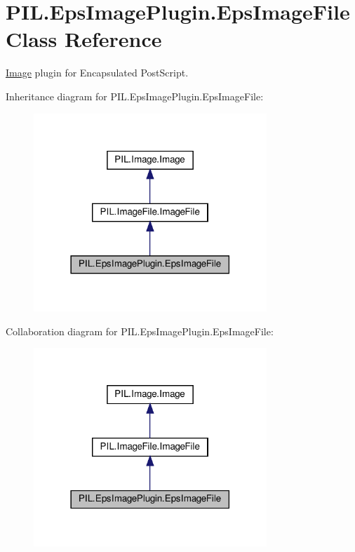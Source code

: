 \hypertarget{classPIL_1_1EpsImagePlugin_1_1EpsImageFile}{}\section{P\+I\+L.\+Eps\+Image\+Plugin.\+Eps\+Image\+File Class Reference}
\label{classPIL_1_1EpsImagePlugin_1_1EpsImageFile}


\hyperlink{namespacePIL_1_1Image}{Image} plugin for Encapsulated Post\+Script.  




Inheritance diagram for P\+I\+L.\+Eps\+Image\+Plugin.\+Eps\+Image\+File\+:
\nopagebreak
\begin{figure}[H]
\begin{center}
\leavevmode
\includegraphics[width=249pt]{classPIL_1_1EpsImagePlugin_1_1EpsImageFile__inherit__graph}
\end{center}
\end{figure}


Collaboration diagram for P\+I\+L.\+Eps\+Image\+Plugin.\+Eps\+Image\+File\+:
\nopagebreak
\begin{figure}[H]
\begin{center}
\leavevmode
\includegraphics[width=249pt]{classPIL_1_1EpsImagePlugin_1_1EpsImageFile__coll__graph}
\end{center}
\end{figure}
